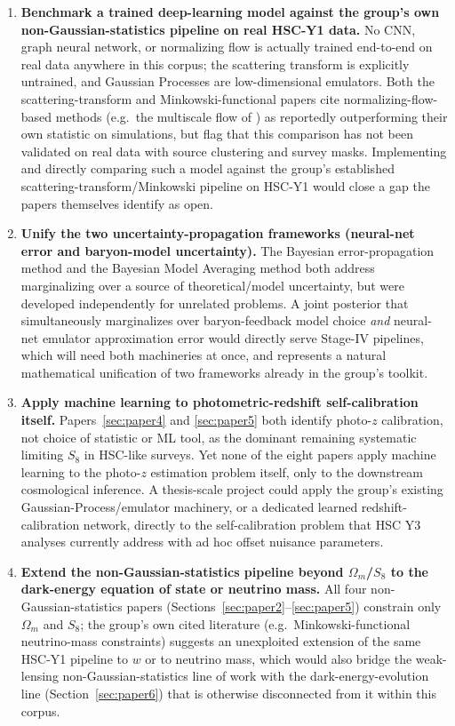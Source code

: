 \documentclass[11pt]{article}
\begin{document}
\begin{enumerate}[leftmargin=1.4em]
\item \textbf{Benchmark a trained deep-learning model against the group's own non-Gaussian-statistics pipeline on real HSC-Y1 data.} No CNN, graph neural network, or normalizing flow is actually trained end-to-end on real data anywhere in this corpus; the scattering transform is explicitly untrained, and Gaussian Processes are low-dimensional emulators. Both the scattering-transform and Minkowski-functional papers cite normalizing-flow-based methods (e.g.\ the multiscale flow of \citealt{cheng2024scattering}) as reportedly outperforming their own statistic on simulations, but flag that this comparison has not been validated on real data with source clustering and survey masks. Implementing and directly comparing such a model against the group's established scattering-transform/Minkowski pipeline on HSC-Y1 would close a gap the papers themselves identify as open.

\item \textbf{Unify the two uncertainty-propagation frameworks (neural-net error and baryon-model uncertainty).} The Bayesian error-propagation method \citep{grandon2022bayesian} and the Bayesian Model Averaging method \citep{grandon2024bma} both address marginalizing over a source of theoretical/model uncertainty, but were developed independently for unrelated problems. A joint posterior that simultaneously marginalizes over baryon-feedback model choice \emph{and} neural-net emulator approximation error would directly serve Stage-IV pipelines, which will need both machineries at once, and represents a natural mathematical unification of two frameworks already in the group's toolkit.

\item \textbf{Apply machine learning to photometric-redshift self-calibration itself.} Papers~\ref{sec:paper4} and \ref{sec:paper5} both identify photo-$z$ calibration, not choice of statistic or ML tool, as the dominant remaining systematic limiting $S_8$ in HSC-like surveys. Yet none of the eight papers apply machine learning to the photo-$z$ estimation problem itself, only to the downstream cosmological inference. A thesis-scale project could apply the group's existing Gaussian-Process/emulator machinery, or a dedicated learned redshift-calibration network, directly to the self-calibration problem that HSC Y3 analyses currently address with ad hoc offset nuisance parameters.

\item \textbf{Extend the non-Gaussian-statistics pipeline beyond $\Omega_m$/$S_8$ to the dark-energy equation of state or neutrino mass.} All four non-Gaussian-statistics papers (Sections~\ref{sec:paper2}--\ref{sec:paper5}) constrain only $\Omega_m$ and $S_8$; the group's own cited literature (e.g.\ Minkowski-functional neutrino-mass constraints) suggests an unexploited extension of the same HSC-Y1 pipeline to $w$ or to neutrino mass, which would also bridge the weak-lensing non-Gaussian-statistics line of work with the dark-energy-evolution line (Section~\ref{sec:paper6}) that is otherwise disconnected from it within this corpus.


\end{enumerate}
\end{document}
